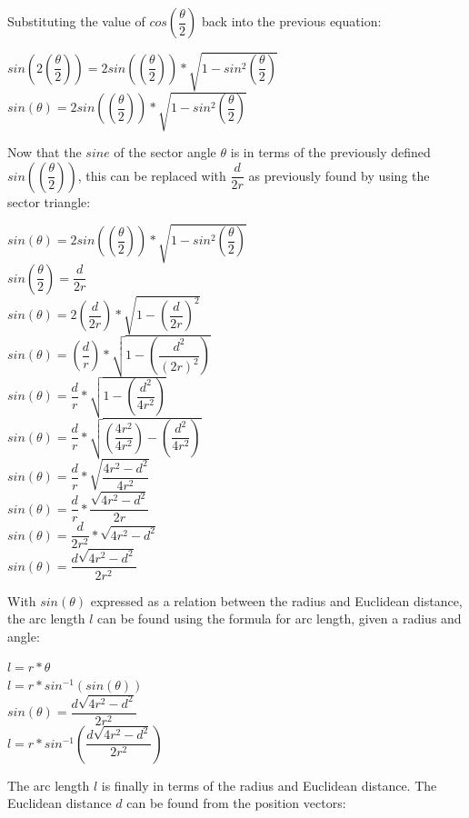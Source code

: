 \documentclass[a4paper]{article}
\begin{document}
Substituting the value of $cos\left(\dfrac{\theta}{2	}\right)$ back into the previous equation: 

\begin{center}
\textbf{$sin(2\left(\dfrac{\theta}{2}\right)) = 2sin(\left(\dfrac{\theta}{2}\right))*\sqrt{1-sin^2\left(\dfrac{\theta}{2}\right)}$}\\
\medskip
\textbf{$sin(\theta) = 2sin(\left(\dfrac{\theta}{2}\right))*\sqrt{1-sin^2\left(\dfrac{\theta}{2}\right)}$}\\
\end{center}

Now that the $sine$ of the sector angle $\theta$ is in terms of the previously defined $sin(\left(\dfrac{\theta}{2}\right))$, this can be replaced with $\dfrac{d}{2r}$ as previously found by using the sector triangle: 

\begin{center}
\textbf{$sin(\theta) = 2sin(\left(\dfrac{\theta}{2}\right))*\sqrt{1-sin^2\left(\dfrac{\theta}{2}\right)}$}\\
\medskip
\textbf{$sin\left(\dfrac{\theta}{2}\right) = \dfrac{d}{2r}$}\\
\medskip
\textbf{$sin(\theta) = 2\left(\dfrac{d}{2r}\right)*\sqrt{1-\left(\dfrac{d}{2r}\right)^2}$}\\
\medskip
\textbf{$sin(\theta) = \left(\dfrac{d}{r}\right)*\sqrt{1-\left(\dfrac{d^2}{(2r)^2}\right)}$}\\
\medskip
\textbf{$sin(\theta) = \dfrac{d}{r}*\sqrt{1-\left(\dfrac{d^2}{4r^2}\right)}$}\\
\medskip
\textbf{$sin(\theta) = \dfrac{d}{r}*\sqrt{\left(\dfrac{4r^2}{4r^2}\right)-\left(\dfrac{d^2}{4r^2}\right)}$}\\
\medskip
\textbf{$sin(\theta) = \dfrac{d}{r}* \sqrt{\dfrac{4r^2-d^2}{4r^2}}$}\\
\medskip
\textbf{$sin(\theta) = \dfrac{d}{r}* \dfrac{\sqrt{4r^2-d^2}}{2r}$}\\
\medskip
\textbf{$sin(\theta) = \dfrac{d}{2r^2}* \sqrt{4r^2-d^2}$}\\
\medskip
\textbf{$sin(\theta) = \dfrac{d\sqrt{4r^2-d^2}}{2r^2}$}\\
\end{center}

With $sin(\theta)$ expressed as a relation between the radius and Euclidean distance, the arc length $l$ can be found using the formula for arc length, given a radius and angle: 

\begin{center}
\textbf{$l = r * \theta$}\\
\textbf{$l = r * sin^{-1}(sin(\theta))$}\\
\medskip
\textbf{$sin(\theta) = \dfrac{d\sqrt{4r^2-d^2}}{2r^2}$}\\
\medskip
\textbf{$l = r * sin^{-1}\left(\dfrac{d\sqrt{4r^2-d^2}}{2r^2}\right)$}\\
\end{center}
The arc length $l$ is finally in terms of the radius and Euclidean distance. The Euclidean distance $d$ can be found from the position vectors: 
\end{document}
